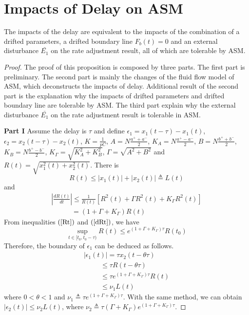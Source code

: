 \documentclass{sig-alternate-10pt}
\begin{document}
\section{Impacts of Delay on ASM}
\begin{theorem}
The impacts of the delay are equivalent to the impacts of the combination of a drifted parameters, a drifted boundary line $F_b(t)=0$ and an external disturbance $\bar{E_1}$ on the rate adjustment result, all of which are tolerable by ASM.
\label{Proposition2}
\end{theorem}
\begin{proof}
The proof of this proposition is composed by three parts. The first part is preliminary. The second part is mainly the changes of the fluid flow model of ASM, which deconstructs the impacts of delay. Additional result of the second part is the explanation why the impacts of drifted parameters and drifted boundary line are tolerable by ASM. The third part explain why the external disturbance $\bar{E_1}$ on the rate adjustment result is tolerable in ASM.

\textbf{Part I}
Assume the delay is $\tau$ and define $\epsilon_1=x_1(t-\tau)-x_1(t)$, $\epsilon_2=x_2(t-\tau)-x_2(t)$, $K=\frac{1}{pC}$, $A=N\frac{a^++a^-}{2}$, $K_A=N\frac{a^+-a^-}{2}$, $B=N\frac{b^++b^-}{2}$, $K_B=N\frac{b^+-b^-}{2}$, $K_\Gamma=\sqrt{K_A^2+K_B^2}$, $\Gamma=\sqrt{A^2+B^2}$ and $R(t)=\sqrt{x_1^2(t)+x_2^2(t)}$. There is
\begin{equation}
R(t)\leq |x_1(t)|+|x_2(t)|\triangleq L(t)
\label{Rt}
\end{equation}
and
\begin{equation}
\begin{array}{l}
|\frac{dR(t)}{dt}| \leq \frac{1}{R(t)}[R^2(t)+\Gamma R^2(t)+K_\Gamma R^2(t)] \\
\qquad\quad      =(1+\Gamma+K_\Gamma)R(t)
\end{array}
\label{dRt}
\end{equation}
From inequalities $(\ref{Rt})$ and $(\ref{dRt})$, we have
\begin{equation}
\sup\limits_{t\in[t_0,t_0-\tau)}^{}R(t)\leq e^{(1+\Gamma+K_\Gamma)\tau}R(t_0)
\end{equation}
Therefore, the boundary of $\epsilon_1$ can be deduced as follows.
\begin{equation}
\begin{array}{l}
|\epsilon_1(t)| =\tau x_2(t-\theta\tau ) \\
\qquad\ \ \leq \tau R(t-\theta\tau ) \\
\qquad\ \ \leq \tau e^{(1+\Gamma+K_\Gamma)\tau }R(t)\\
\qquad\ \ \leq \nu_1L(t)
\end{array}
\label{jwc1}
\end{equation}
where $0<\theta<1$ and $\nu_1\triangleq\tau e^{(1+\Gamma+K_\Gamma)\tau }$. With the same method, we can obtain $|\epsilon_2(t)|\leq \nu_2L(t)$, where $\nu_2\triangleq\tau (\Gamma+K_\Gamma)e^{(1+\Gamma+K_\Gamma)\tau }$.


\end{proof}
\end{document}
